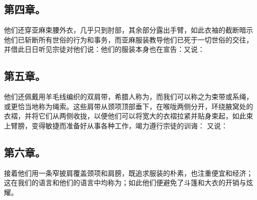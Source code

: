 
\subsection{第四章。}

\par

他们还穿亚麻束腰外衣，几乎只到肘部，其余部分露出手臂，如此衣袖的截断暗示他们已斩断所有世俗的行为和事务，而亚麻服装教导他们已死于一切世俗的交往，并借此日日听见宗徒对他们说：他们的服装本身也在宣告：又说：\par


\subsection{第五章。}

\par

他们还佩戴用羊毛线编织的双肩带，希腊人称为，而我们可以称之为束带或系绳，或更恰当地称为绳索。这些肩带从颈项顶部垂下，在喉咙两侧分开，环绕腋窝处的衣褶，并将它们从两侧收拢，以便他们可以将宽大的衣褶拉紧并贴身束起，如此束上臂膀，变得敏捷而准备好从事各种工作，竭力遵行宗徒的训诲： 又说：\par


\subsection{第六章。}

\par

接着他们用一条窄披肩覆盖颈项和肩膀，既追求服装的朴素，也注重便宜和经济；这在我们的语言和他们的语言中均称为；如此他们便避免了斗篷和大衣的开销与炫耀。\par

